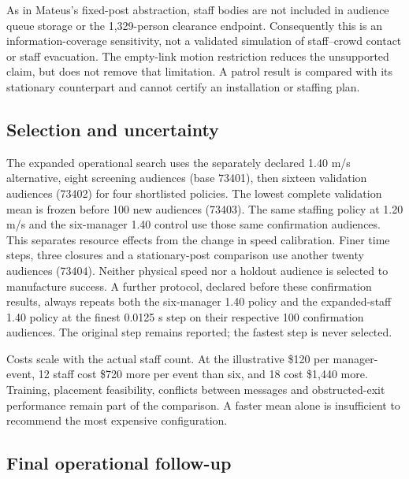 \documentclass[11pt,a4paper]{article}
\begin{document}
As in Mateus's fixed-post abstraction, staff bodies are not included in audience queue storage or the 1,329-person clearance endpoint. Consequently this is an information-coverage sensitivity, not a validated simulation of staff–crowd contact or staff evacuation. The empty-link motion restriction reduces the unsupported claim, but does not remove that limitation. A patrol result is compared with its stationary counterpart and cannot certify an installation or staffing plan.


\subsection{Selection and uncertainty}

The expanded operational search uses the separately declared 1.40 m/s alternative, eight screening audiences (base 73401), then sixteen validation audiences (73402) for four shortlisted policies. The lowest complete validation mean is frozen before 100 new audiences (73403). The same staffing policy at 1.20 m/s and the six-manager 1.40 control use those same confirmation audiences. This separates resource effects from the change in speed calibration. Finer time steps, three closures and a stationary-post comparison use another twenty audiences (73404). Neither physical speed nor a holdout audience is selected to manufacture success. A further protocol, declared before these confirmation results, always repeats both the six-manager 1.40 policy and the expanded-staff 1.40 policy at the finest 0.0125 s step on their respective 100 confirmation audiences. The original step remains reported; the fastest step is never selected.


Costs scale with the actual staff count. At the illustrative \$120 per manager-event, 12 staff cost \$720 more per event than six, and 18 cost \$1,440 more. Training, placement feasibility, conflicts between messages and obstructed-exit performance remain part of the comparison. A faster mean alone is insufficient to recommend the most expensive configuration.


\subsection{Final operational follow-up}
\end{document}
